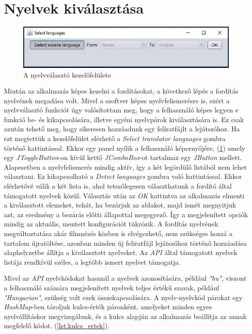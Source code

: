 \section{Nyelvek kiválasztása}

\begin{figure}
  \includegraphics[width=\linewidth]{images/language_selection.jpg}
  \caption{A nyelvválasztó kezelőfelülete}
  \label{fig:language_selection}
\end{figure}

Miután az alkalmazás képes kezelni a fordításokat, a következő lépés a fordítás nyelvének megadása volt. Mivel a szoftver képes nyelvfelismerésre is, ezért a nyelvválasztó funkciót úgy valósítottam meg, hogy a felhasználó képes legyen e funkció be- és kikapcsolására, illetve egyéni nyelvpárok kiválasztására is.  Ez csak azután tehető meg, hogy sikeresen hozzáadunk egy feliratfájlt a lejátszóhoz. Ha ezt megtettük a kezelőfelület elérhető a \textit{Select translator languages} gombra történő kattintással.  Ekkor egy panel nyílik a felhasználó képernyőjére, (\ref{fig:language_selection}) amely egy \textit{JToggleButton}-on kívül kettő \textit{JComboBox}-ot tartalmaz egy \textit{JButton} mellett. Alapesetben a nyelvfelismerés mindig aktív, így a két legördülő listából nem lehet választani. Ez kikapcsolható a \textit{Detect languages} gombra való kattintással. Ekkor elérhetővé válik a két lista is, ahol tetszőlegesen választhatunk a fordító által támogatott nyelvek közül. Választás után az \textit{OK} kattintva az alkalmazás elmenti a kiválasztott elemeket, tehát, ha bezárjuk az ablakot, majd ismét megnyitjuk azt, az eredmény a bezárás előtti állapottal megegyező. Így a megjelenített opciók mindig az aktuális, mentett konfigurációt tükrözik. A fordítás nyelvének megváltoztatása akár filmnézés közben is elvégezhető, nem szükséges hozzá a tartalom újratöltése, azonban minden új feliratfájl lejátszóhoz történő hozzáadása alaphelyzetbe állítja a kiválasztott nyelveket. Az \textit{API} által támogatott nyelvek listája rendkívül széles, a legtöbb ismert nyelvet támogatja.

Mivel az \textit{API} nyelvkódokat használ a nyelvek azonosítására, például \textit{"hu"}, viszont a felhasználó számára megjelenített nyelvek teljes értékű szavak, például \textit{"Hungarian"}, szükség volt ezek összekapcsolására. A nyelv-nyelvkód párokat egy \textit{HashMap}-ben tároljuk kulcs-érték páronként, amelyeket minden egyes nyelvállításkor megvizsgálunk, és  a kulcs alapján az alkalmazás beállítja az annak megfelelő kódot. (\ref{lst:kulcs_ertek}).

